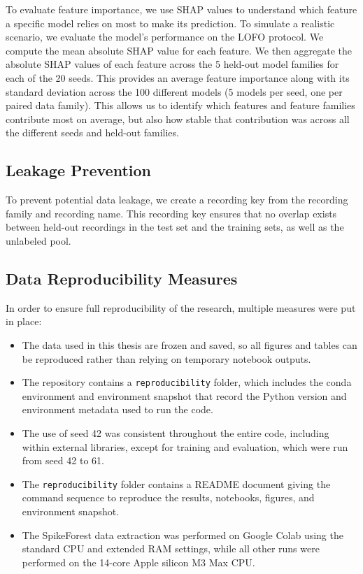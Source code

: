 To evaluate feature importance, we use SHAP values \parencite{lundberg2017unifiedapproachinterpretingmodel} to understand which feature a specific model relies on most to make its prediction. To simulate a realistic scenario, we evaluate the model's performance on the LOFO protocol. We compute the mean absolute SHAP value for each feature. We then aggregate the absolute SHAP values of each feature across the 5 held-out model families for each of the 20 seeds. This provides an average feature importance along with its standard deviation across the 100 different models (5 models per seed, one per paired data family). This allows us to identify which features and feature families contribute most on average, but also how stable that contribution was across all the different seeds and held-out families.

\subsection{Leakage Prevention}

To prevent potential data leakage, we create a recording key from the recording family and recording name. This recording key ensures that no overlap exists between held-out recordings in the test set and the training sets, as well as the unlabeled pool. 

\subsection{Data Reproducibility Measures}

In order to ensure full reproducibility of the research, multiple measures were put in place:

\begin{itemize}
    \item The data used in this thesis are frozen and saved, so all figures and tables can be reproduced rather than relying on temporary notebook outputs.
    \item The repository contains a \texttt{reproducibility} folder, which includes the conda environment and environment snapshot that record the Python version and environment metadata used to run the code.
    \item The use of seed 42 was consistent throughout the entire code, including within external libraries, except for training and evaluation, which were run from seed 42 to 61.
    \item The \texttt{reproducibility} folder contains a README document giving the command sequence to reproduce the results, notebooks, figures, and environment snapshot.
    \item The SpikeForest data extraction was performed on Google Colab using the standard CPU and extended RAM settings, while all other runs were performed on the 14-core Apple silicon M3 Max CPU.
\end{itemize}
